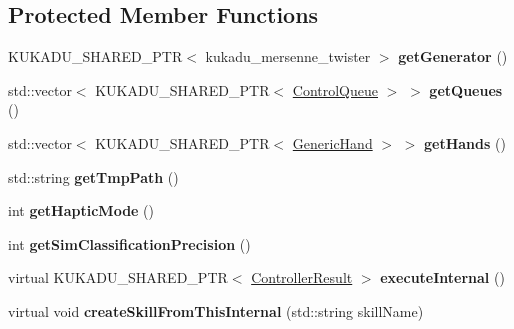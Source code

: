 \subsection*{Protected Member Functions}
\begin{DoxyCompactItemize}
\item 
K\+U\+K\+A\+D\+U\+\_\+\+S\+H\+A\+R\+E\+D\+\_\+\+P\+TR$<$ kukadu\+\_\+mersenne\+\_\+twister $>$ {\bfseries get\+Generator} ()\hypertarget{classkukadu_1_1SensingController_afc0c30cc64d0683094e53856463a5a14}{}\label{classkukadu_1_1SensingController_afc0c30cc64d0683094e53856463a5a14}

\item 
std\+::vector$<$ K\+U\+K\+A\+D\+U\+\_\+\+S\+H\+A\+R\+E\+D\+\_\+\+P\+TR$<$ \hyperlink{classkukadu_1_1ControlQueue}{Control\+Queue} $>$ $>$ {\bfseries get\+Queues} ()\hypertarget{classkukadu_1_1SensingController_aebfb6e5ec327fd8731ad244ef22864f6}{}\label{classkukadu_1_1SensingController_aebfb6e5ec327fd8731ad244ef22864f6}

\item 
std\+::vector$<$ K\+U\+K\+A\+D\+U\+\_\+\+S\+H\+A\+R\+E\+D\+\_\+\+P\+TR$<$ \hyperlink{classkukadu_1_1GenericHand}{Generic\+Hand} $>$ $>$ {\bfseries get\+Hands} ()\hypertarget{classkukadu_1_1SensingController_a325861fdc90c26fb03b92ebb16fcb469}{}\label{classkukadu_1_1SensingController_a325861fdc90c26fb03b92ebb16fcb469}

\item 
std\+::string {\bfseries get\+Tmp\+Path} ()\hypertarget{classkukadu_1_1SensingController_aa20053f2266322fbbd327f1bbed658dd}{}\label{classkukadu_1_1SensingController_aa20053f2266322fbbd327f1bbed658dd}

\item 
int {\bfseries get\+Haptic\+Mode} ()\hypertarget{classkukadu_1_1SensingController_a351901d07d4a17d855a4c63b24788af6}{}\label{classkukadu_1_1SensingController_a351901d07d4a17d855a4c63b24788af6}

\item 
int {\bfseries get\+Sim\+Classification\+Precision} ()\hypertarget{classkukadu_1_1SensingController_acd94396772ba64fbfd14d7fcc3c581e9}{}\label{classkukadu_1_1SensingController_acd94396772ba64fbfd14d7fcc3c581e9}

\item 
virtual K\+U\+K\+A\+D\+U\+\_\+\+S\+H\+A\+R\+E\+D\+\_\+\+P\+TR$<$ \hyperlink{classkukadu_1_1ControllerResult}{Controller\+Result} $>$ {\bfseries execute\+Internal} ()\hypertarget{classkukadu_1_1SensingController_afe31e275dcc4178bd05cfb962e05941a}{}\label{classkukadu_1_1SensingController_afe31e275dcc4178bd05cfb962e05941a}

\item 
virtual void {\bfseries create\+Skill\+From\+This\+Internal} (std\+::string skill\+Name)\hypertarget{classkukadu_1_1SensingController_a50c7f9b186b6ef90661d27820fc9040c}{}\label{classkukadu_1_1SensingController_a50c7f9b186b6ef90661d27820fc9040c}

\end{DoxyCompactItemize}
